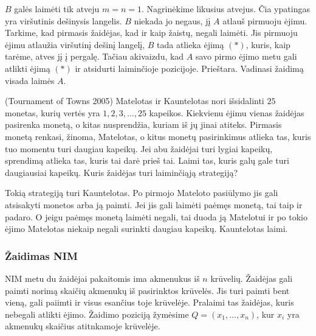\begin{sprendimas}
  $B$ galės laimėti tik atveju $m=n=1$. Nagrinėkime likusius atvejus. Čia
  ypatingas yra viršutinis dešinysis langelis. $B$ niekada jo negaus, jį $A$
  atlauš pirmuoju ėjimu. Tarkime, kad pirmasis žaidėjas, kad ir kaip žaistų,
  negali laimėti. Jis pirmuoju ėjimu atlaužia viršutinį dešinį langelį, $B$
  tada atlieka ėjimą $(*)$, kuris, kaip tarėme, atves jį į pergalę. Tačiau
  akivaizdu, kad $A$ savo pirmo ėjimo metu gali atlikti ėjimą $(*)$ ir
  atsidurti laiminčioje pozicijoje. Prieštara. Vadinasi žaidimą visada laimės
  $A$. 
\end{sprendimas}

\begin{pavnr}{(Tournament of Towns 2005)}
  Matelotas ir Kauntelotas nori išsidalinti $25$ monetas, kurių vertės yra $1, 2, 3, \dots
  , 25$ kapeikos. Kiekvienu ėjimu vienas žaidėjas pasirenka monetą, o kitas
  nusprendžia, kuriam iš jų jinai atiteks. Pirmasis monetą renkasi, žinoma,
  Matelotas, o kitus monetų pasirinkimus atlieka tas, kuris tuo momentu turi
  daugiau kapeikų. Jei abu žaidėjai turi lygiai kapeikų, sprendimą atlieka
  tas, kuris tai darė prieš tai. Laimi tas, kuris galų gale turi
  daugiausiai kapeikų.  Kuris žaidėjas turi laiminčiąją strategiją?
\end{pavnr}

\begin{sprendimas}
  Tokią strategiją turi Kauntelotas. Po pirmojo Mateloto pasiūlymo jis gali atsisakyti
  monetos arba ją paimti. Jei jis gali laimėti paėmęs monetą, tai taip ir
  padaro. O jeigu paėmęs monetą laimėti negali, tai duoda ją Matelotui ir po
  tokio ėjimo Matelotas niekaip negali surinkti daugiau kapeikų. Kauntelotas laimi.
\end{sprendimas}

\subsubsection{Žaidimas NIM}

\begin{api}
  NIM metu du žaidėjai pakaitomis ima akmenukus iš $n$ krūvelių. Žaidėjas gali paimti
  norimą skaičių akmenukų iš pasirinktos krūvelės. Jis turi paimti bent vieną, gali paiimti ir visus esančius toje krūvelėje. Pralaimi tas žaidėjas, kuris nebegali atlikti ėjimo. Žaidimo poziciją žymėsime $Q=(x_{1},\ldots,x_{n})$, 
kur $x_{i}$ yra akmenukų skaičius atitnkamoje krūvelėje. 
\end{api}

